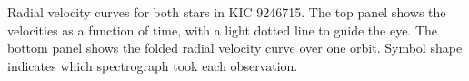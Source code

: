 \label{fig:rvfig} Radial velocity curves for both stars in KIC 9246715. The top panel shows the velocities as a function of time, with a light dotted line to guide the eye. The bottom panel shows the folded radial velocity curve over one orbit. Symbol shape indicates which spectrograph took each observation. 
  
  